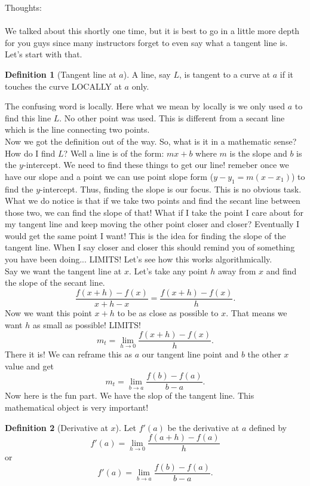 \documentclass[10pt]{article}
\theoremstyle{Theorem}
\theoremstyle{definition}
\newtheorem{definition}{Definition}[section]
\theoremstyle{remark}
\theoremstyle{custom}
\begin{document}
\thispagestyle{firststyle}
\pagestyle{plain}

Thoughts:\\\\
We talked about this shortly one time, but it is best to go in a little more depth for you guys since many instructors forget to even say what a tangent line is. Let's start with that.
\begin{definition}[Tangent line at $a$]
A line, say $L$, is tangent to a curve at $a$ if it touches the curve LOCALLY at $a$ only. 
\end{definition}
\noindent The confusing word is locally. Here what we mean by locally is we only used $a$ to find this line $L$. No other point was used. This is different from a secant line which is the line connecting two points.\\
Now we got the definition out of the way. So, what is it in a mathematic sense? How do I find $L$? Well a line is of the form: $mx+b$ where $m$ is the slope and $b$ is the $y$-intercept. 
We need to find these things to get our line! remeber once we have our slope and a point we can use point slope form ($y-y_1=m(x-x_1)$) to find the $y$-intercept. Thus, finding the slope is our focus.  This is no obvious task. What we do notice is that if we take two points and find the secant line between those two, we can find the slope of that! What if I take the point I care about for my tangent line and keep moving the other point closer and closer? Eventually I would get the same point I want! This is the idea for finding the slope of the tangent line. When I say closer and closer this should remind you of something you have been doing... LIMITS! Let's see how this works algorithmically.\\
Say we want the tangent line at $x$. Let's take any point $h$ away from $x$ and find the slope of the secant line. 
\[
\dfrac{f(x+h)-f(x)}{x+h-x}=\dfrac{f(x+h)-f(x)}{h}.
\]
Now we want this point $x+h$ to be as close as possible to $x$. That means we want $h$ as small as possible! LIMITS!
\[
m_t=\lim_{h\rightarrow 0}\dfrac{f(x+h)-f(x)}{h}.
\]
There it is! We can reframe this as $a$ our tangent line point and $b$ the other $x$ value and get
\[
m_t=\lim_{b\rightarrow a}\dfrac{f(b)-f(a)}{b-a}.
\]
Now here is the fun part. We have the slop of the tangent line. This mathematical object is very important!
\begin{definition}[Derivative at $x$]
Let $f'(a)$ be the derivative at $a$ defined by
\[
f'(a)=\lim_{h\rightarrow 0}\dfrac{f(a+h)-f(a)}{h}
\]
or
\[
f'(a)=\lim_{b\rightarrow a}\dfrac{f(b)-f(a)}{b-a}.
\]
\end{definition}
\end{document}
